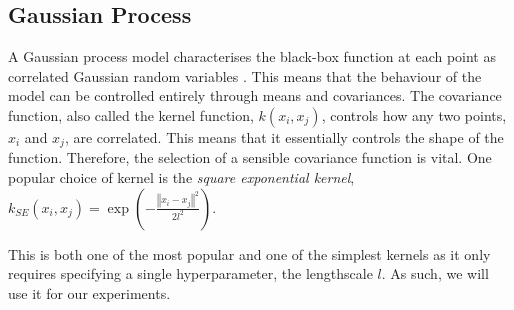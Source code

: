 \documentclass[preprint]{elsarticle}
\begin{document}
\subsection{Gaussian Process}
A Gaussian process model characterises the black-box function at each point as correlated Gaussian random variables \citep{Rasmussen2006}. This means that the behaviour of the model can be controlled entirely through means and covariances. The covariance function, also called the kernel function, $k(x_{i},x_{j})$, controls how any two points, $x_i$ and $x_j$, are correlated. This means that it essentially controls the shape of the function. Therefore, the selection of a sensible covariance function is vital. 
One popular choice of kernel is the \emph{square exponential kernel}, $k_{SE}(x_{i},x_{j})=\exp\left(-\frac{\left\Vert x_{i}-x_{j}\right\Vert ^{2}}{2l^{2}}\right)$.

This is both one of the most popular and one of the simplest kernels as it only requires specifying a single hyperparameter, the lengthscale $l$. As such, we will use it for our experiments. %
\end{document}
